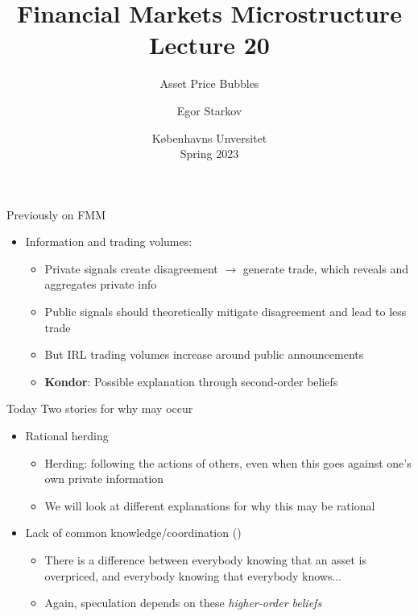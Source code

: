 \documentclass[english,10pt
,aspectratio=169
]{beamer}
\title{Financial Markets Microstructure \\ Lecture 20}
\subtitle{Asset Price Bubbles}
\author{Egor Starkov}
\date{K{\o}benhavns Unversitet \\
	Spring 2023}
\begin{document}
	\frame[plain]{\titlepage}



\begin{frame}{Previously on FMM}
	\begin{itemize}
		\item Information and trading volumes:
		\begin{itemize}
			\item Private signals create disagreement $\to$ generate trade, which reveals and aggregates private info
			\item Public signals should theoretically mitigate disagreement and lead to less trade
			\item But IRL trading volumes increase around public announcements
			\item \textbf{Kondor}: Possible explanation through second-order beliefs
		\end{itemize}
	\end{itemize}
\end{frame}	


\begin{frame}{Today}
	Two stories for why  may occur
	\begin{itemize}
		\item Rational herding
		\begin{itemize}
			\item Herding: following the actions of others, even when this goes against one's own private information
			\item We will look at different explanations for why this may be rational
		\end{itemize}
		\item Lack of common knowledge/coordination (\cite{abreu_bubbles_2003})
		\begin{itemize}
			\item There is a difference between everybody knowing that an asset is overpriced, and everybody knowing that everybody knows...
			\item Again, speculation depends on these \emph{higher-order beliefs}
		\end{itemize}
	\end{itemize}
\end{frame}
\end{document}
